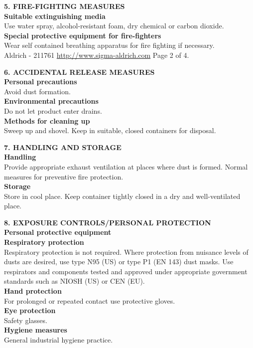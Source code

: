 \begin{multicols*}{2}
\begin{flushleft}
\begin{sans}
\textbf{5. FIRE-FIGHTING MEASURES}\\
\textbf{Suitable extinguishing media}\\
Use water spray, alcohol-resistant foam, dry chemical or carbon dioxide.\\
\textbf{Special protective equipment for fire-fighters}\\
Wear self contained breathing apparatus for fire fighting if necessary.\\
Aldrich - 211761 \url{http://www.sigma-aldrich.com} Page 2 of 4.

\textbf{6. ACCIDENTAL RELEASE MEASURES}\\
\textbf{Personal precautions}\\
Avoid dust formation.\\
\textbf{Environmental precautions}\\
Do not let product enter drains.\\
\textbf{Methods for cleaning up}\\
Sweep up and shovel. Keep in suitable, closed containers for disposal.

\textbf{7. HANDLING AND STORAGE}\\
\textbf{Handling}\\
Provide appropriate exhaust ventilation at places where dust is formed. Normal measures for preventive fire protection.\\
\textbf{Storage}\\
Store in cool place. Keep container tightly closed in a dry and well-ventilated place.

\textbf{8. EXPOSURE CONTROLS/PERSONAL PROTECTION}\\
\textbf{Personal protective equipment}\\
\textbf{Respiratory protection}\\
Respiratory protection is not required. Where protection from nuisance levels of dusts are desired, use type N95 (US) or type P1 (EN 143) dust masks. Use respirators and components tested and approved under appropriate government standards such as NIOSH (US) or CEN (EU).\\
\textbf{Hand protection}\\
For prolonged or repeated contact use protective gloves.\\
\textbf{Eye protection}\\
Safety glasses.\\
\textbf{Hygiene measures}\\
General industrial hygiene practice.


\end{sans}
\end{flushleft}
\end{multicols*}
